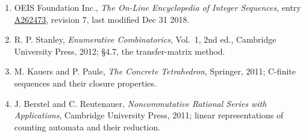 \documentclass[11pt]{article}
\theoremstyle{definition}
\begin{document}
\begin{enumerate}

\item OEIS Foundation Inc., \emph{The On-Line Encyclopedia of Integer Sequences}, entry \href{https://oeis.org/A262473}{A262473}, revision 7, last modified Dec 31 2018.

\item R. P. Stanley, \emph{Enumerative Combinatorics}, Vol.~1, 2nd ed., Cambridge University Press, 2012; \S4.7, the transfer-matrix method.

\item M. Kauers and P. Paule, \emph{The Concrete Tetrahedron}, Springer, 2011; C-finite sequences and their closure properties.

\item J. Berstel and C. Reutenauer, \emph{Noncommutative Rational Series with Applications}, Cambridge University Press, 2011; linear representations of counting automata and their reduction.

\end{enumerate}
\end{document}
